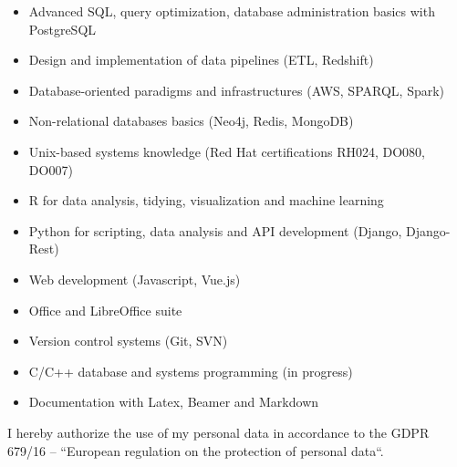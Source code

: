 \documentclass[10pt, a4paper, roman]{moderncv}        %
\begin{document}
	\begin{itemize}
		
		\item Advanced SQL, query optimization, database administration basics with PostgreSQL
		
		\vspace{1pt}
		
		\item Design and implementation of data pipelines (ETL, Redshift)
		
		\vspace{1pt}
		
		\item Database-oriented paradigms and infrastructures (AWS, SPARQL, Spark)
		
		\vspace{1pt}
		
		\item Non-relational databases basics (Neo4j, Redis, MongoDB)
		
		\vspace{1pt}
		
		\item Unix-based systems knowledge (Red Hat certifications RH024, DO080, DO007)
		
		\vspace{1pt}
		
		\item R for data analysis, tidying, visualization and machine learning
		
		\vspace{1pt}
		
		\item Python for scripting, data analysis and API development (Django, Django-Rest)
		
		\vspace{1pt}
		
		\item Web development (Javascript, Vue.js)
		
		\vspace{1pt}
		
		\item Office and LibreOffice suite
		
		\vspace{1pt}
		
		\item Version control systems (Git, SVN)
		
		\vspace{1pt}
		
		\item C/C++ database and systems programming (in progress)
		
		\vspace{1pt}
		
		\item Documentation with Latex, Beamer and Markdown
		
	\end{itemize}
	
	\vspace{100pt}
	I hereby authorize the use of my personal data in accordance to the GDPR 679/16 – “European regulation on the protection of personal data``.
	
\end{document}
